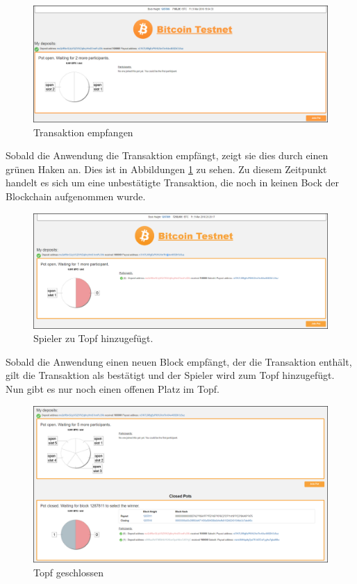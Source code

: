 \begin{figure}[H]
\centering
\includegraphics[width=1\linewidth]{Figures/btc_gui/pot_open_payment_received}
\decoRule
\caption{Transaktion empfangen}
\label{fig:pot_open_payment_received}
\end{figure}

Sobald die Anwendung die Transaktion empfängt, zeigt sie dies durch einen grünen Haken an. Dies ist in Abbildungen \ref{fig:pot_open_payment_received} zu sehen. Zu diesem Zeitpunkt handelt es sich um eine unbestätigte Transaktion, die noch in keinen Bock der Blockchain aufgenommen wurde.

\begin{figure}[H]
\centering
\includegraphics[width=1\linewidth]{Figures/btc_gui/pot_open_p1_confirmed}
\decoRule
\caption{Spieler zu Topf hinzugefügt.}
\label{fig:pot_open_p1_confirmed}
\end{figure}
Sobald die Anwendung einen neuen Block empfängt, der die Transaktion enthält, gilt die Transaktion als bestätigt und der Spieler wird zum Topf hinzugefügt. Nun gibt es nur noch einen offenen Platz im Topf.

\begin{figure}[H]
\centering
\includegraphics[width=1\linewidth]{Figures/btc_gui/pot_closed}
\decoRule
\caption{Topf geschlossen}
\label{fig:pot_closed}
\end{figure}


